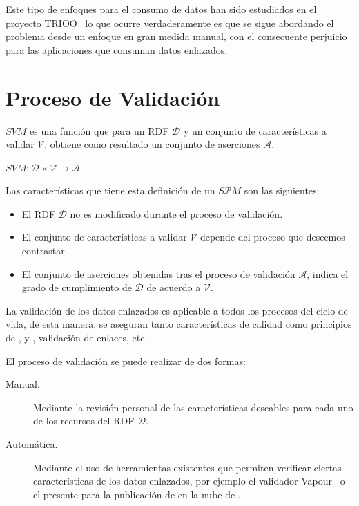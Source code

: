Este tipo de enfoques para el consumo de datos han sido estudiados en el proyecto \gls{TRIOO}~\cite{DBLP:conf/icsoft/FernandezBRG10} lo que ocurre 
verdaderamente es que se sigue abordando el problema desde un enfoque en gran medida manual, con el consecuente perjuicio para las 
aplicaciones que consuman datos enlazados.

\section{Proceso de Validación}\label{sect:validation}
\begin{definition}
$SVM$ es una función que para un \dataset \gls{RDF} $\mathcal{D}$ y un conjunto de características
a validar $\mathcal{V}$, obtiene como resultado un conjunto de aserciones $\mathcal{A}$.
\end{definition}

\begin{center}
    $SVM :  \mathcal{D} \times \mathcal{V} \longrightarrow \mathcal{A}$
\end{center}
Las características que tiene esta definición de un $S\mathcal{P}M$  son las siguientes:
\begin{itemize}
 \item El \dataset RDF $\mathcal{D}$ no es modificado durante el proceso de validación.
 \item El conjunto de características a validar $\mathcal{V}$ depende del proceso
que deseemos contrastar.
 \item El conjunto de aserciones obtenidas tras el proceso de validación $\mathcal{A}$, indica el grado de cumplimiento de $\mathcal{D}$ de acuerdo a $\mathcal{V}$.
 \end{itemize}

La validación de los datos enlazados es aplicable a todos los procesos del ciclo de vida, de esta manera,
se aseguran tanto características de calidad como principios de \linkeddata, \opendata y \lod, validación
de enlaces, etc. 

El proceso de validación se puede realizar de dos formas:
\begin{description}
 \item [Manual.] Mediante la revisión personal de las características deseables para cada uno de los recursos del \dataset RDF $\mathcal{D}$.
 \item [Automática.] Mediante el uso de herramientas existentes que permiten verificar ciertas características de los datos enlazados, por ejemplo 
el validador Vapour~\cite{Berrueta08cookinghttp} o el presente para la publicación de \datasets en la nube de \linkeddata.
\end{description}


